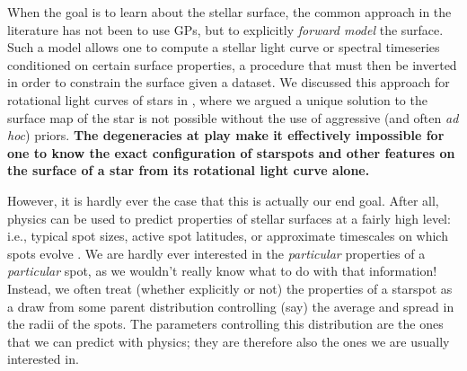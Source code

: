 \documentclass[modern,linenumbers]{aastex62}
\begin{document}

When the goal is to learn about the stellar surface, the common approach
in the literature has not been to use GPs, but to explicitly
\emph{forward model} the surface. Such a model allows one to
compute a stellar light curve or spectral timeseries conditioned
on certain surface properties, a procedure that must then be inverted
in order to constrain the surface given a dataset.
We discussed this approach for rotational light curves of stars
in \citet{PaperI} ,
where we argued a unique solution to the surface map of
the star is not possible without the use of
aggressive (and often \emph{ad hoc}) priors. \textbf{The degeneracies at play
    make it effectively impossible for one to know the exact configuration
    of starspots and other features on the surface of a star from its rotational
    light curve alone.}

However, it is hardly ever the case that this is actually our end goal.
After all, physics can be used to predict properties of stellar surfaces at a fairly
high level: i.e., typical spot sizes, active spot latitudes, or approximate
timescales on which spots evolve
\citep[e.g.,][]{Schuessler1996,Solanki2006,Cantiello2019}.
We are hardly ever interested in the
\emph{particular} properties of a \emph{particular} spot, as we wouldn't really
know what to do with that information! Instead, we often treat
(whether explicitly or not)
the properties of a starspot as a draw from some parent distribution
controlling (say) the average and spread in the radii of the spots.
The parameters controlling this distribution are the ones that we can
predict with physics; they are therefore also the ones we are usually
interested in.
\end{document}
